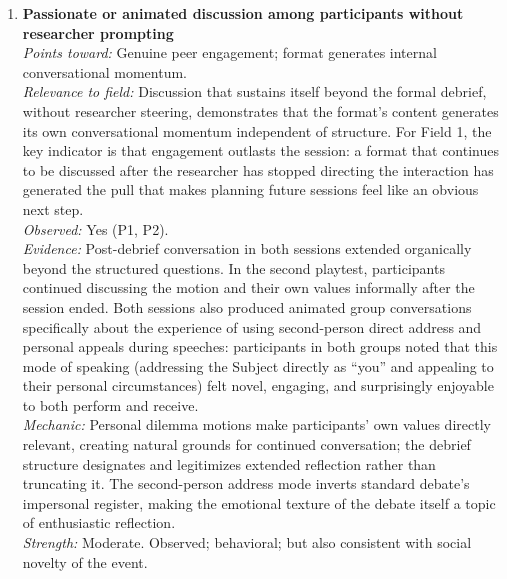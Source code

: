 \documentclass[12pt]{article}
\begin{document}
\begin{enumerate}
\item \textbf{Passionate or animated discussion among participants without researcher prompting}\\
\textit{Points toward:} Genuine peer engagement; format generates internal conversational momentum.\\
\textit{Relevance to field:} Discussion that sustains itself beyond the formal debrief, without researcher steering, demonstrates that the format's content generates its own conversational momentum independent of structure. For Field 1, the key indicator is that engagement outlasts the session: a format that continues to be discussed after the researcher has stopped directing the interaction has generated the pull that makes planning future sessions feel like an obvious next step.\\
\textit{Observed:} Yes (P1, P2).\\
\textit{Evidence:} Post-debrief conversation in both sessions extended organically beyond the structured questions. In the second playtest, participants continued discussing the motion and their own values informally after the session ended. Both sessions also produced animated group conversations specifically about the experience of using second-person direct address and personal appeals during speeches: participants in both groups noted that this mode of speaking (addressing the Subject directly as ``you'' and appealing to their personal circumstances) felt novel, engaging, and surprisingly enjoyable to both perform and receive.\\
\textit{Mechanic:} Personal dilemma motions make participants' own values directly relevant, creating natural grounds for continued conversation; the debrief structure designates and legitimizes extended reflection rather than truncating it. The second-person address mode inverts standard debate's impersonal register, making the emotional texture of the debate itself a topic of enthusiastic reflection.\\
\textit{Strength:} Moderate. Observed; behavioral; but also consistent with social novelty of the event.


\end{enumerate}
\end{document}
